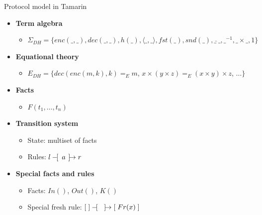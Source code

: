 \documentclass[11pt,aspectratio=169]{beamer}
\begin{document}
\begin{frame}[fragile]{Protocol model in Tamarin}
    \begin{itemize}
        \item \textbf{Term algebra}
        \begin{itemize}
            \item $\Sigma_{DH} = \{enc(\_,\_),dec(\_,\_),h(\_),\langle\_,
                  \_\rangle,fst(\_),snd(\_), \_\hat{\;}\_ , \_^{-1}, 
                  \_\times\_, 1\}$
        \end{itemize}
        \item \textbf{Equational theory}
        \begin{itemize}
            \item $E_{DH} = \{dec(enc(m,k),k) =_E m$, $x \times (y \times z) 
                  =_E (x \times y) \times z$, $\dots \}$
        \end{itemize}
        \item \textbf{Facts}
        \begin{itemize}
            \item $F(t_1, \dots, t_n)$
        \end{itemize}
        \item \textbf{Transition system}
        \begin{itemize}
            \item State: multiset of facts
            \item Rules: $l -\hspace{-4pt}[\hspace{5pt} a \hspace{4pt}]\hspace{-4.6pt}\rightarrow r$
        \end{itemize}
        \item \textbf{Special facts and rules}
        \begin{itemize}
            \item Facts: $In()$, $Out()$, $K()$
            \item Special fresh rule: $\MSR{[\;]}{}{[\;Fr(x)\;]}$
        \end{itemize}
    \end{itemize}
\end{frame}
\end{document}
